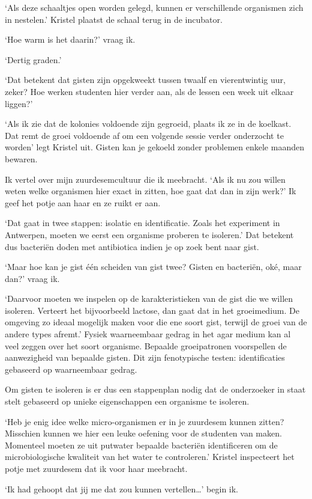 \documentclass[
  11pt,
  dutch,
]{memoir}
\begin{document}
`Als deze schaaltjes open worden gelegd, kunnen er verschillende
organismen zich in nestelen.' Kristel plaatst de schaal terug in de
incubator.

`Hoe warm is het daarin?' vraag ik.

`Dertig graden.'

`Dat betekent dat gisten zijn opgekweekt tussen twaalf en vierentwintig
uur, zeker? Hoe werken studenten hier verder aan, als de lessen een week
uit elkaar liggen?'

`Als ik zie dat de kolonies voldoende zijn gegroeid, plaats ik ze in de
koelkast. Dat remt de groei voldoende af om een volgende sessie verder
onderzocht te worden' legt Kristel uit. Gisten kan je gekoeld zonder
problemen enkele maanden bewaren.

Ik vertel over mijn zuurdesemcultuur die ik meebracht. `Als ik nu zou
willen weten welke organismen hier exact in zitten, hoe gaat dat dan in
zijn werk?' Ik geef het potje aan haar en ze ruikt er aan.

`Dat gaat in twee stappen: isolatie en identificatie. Zoals het
experiment in Antwerpen, moeten we eerst een organisme proberen te
isoleren.' Dat betekent dus bacteriën doden met antibiotica indien je op
zoek bent naar gist.

`Maar hoe kan je gist één scheiden van gist twee? Gisten en bacteriën,
oké, maar dan?' vraag ik.

`Daarvoor moeten we inspelen op de karakteristieken van de gist die we
willen isoleren. Verteert het bijvoorbeeld lactose, dan gaat dat in het
groeimedium. De omgeving zo ideaal mogelijk maken voor die ene soort
gist, terwijl de groei van de andere types afremt.' Fysiek waarneembaar
gedrag in het agar medium kan al veel zeggen over het soort organisme.
Bepaalde groeipatronen voorspellen de aanwezigheid van bepaalde gisten.
Dit zijn fenotypische testen: identificaties gebaseerd op waarneembaar
gedrag.

Om gisten te isoleren is er dus een stappenplan nodig dat de onderzoeker
in staat stelt gebaseerd op unieke eigenschappen een organisme te
isoleren.

`Heb je enig idee welke micro-organismen er in je zuurdesem kunnen
zitten? Misschien kunnen we hier een leuke oefening voor de studenten
van maken. Momenteel moeten ze uit putwater bepaalde bacteriën
identificeren om de microbiologische kwaliteit van het water te
controleren.' Kristel inspecteert het potje met zuurdesem dat ik voor
haar meebracht.

`Ik had gehoopt dat jij me dat zou kunnen vertellen\ldots{}' begin ik.
\end{document}

